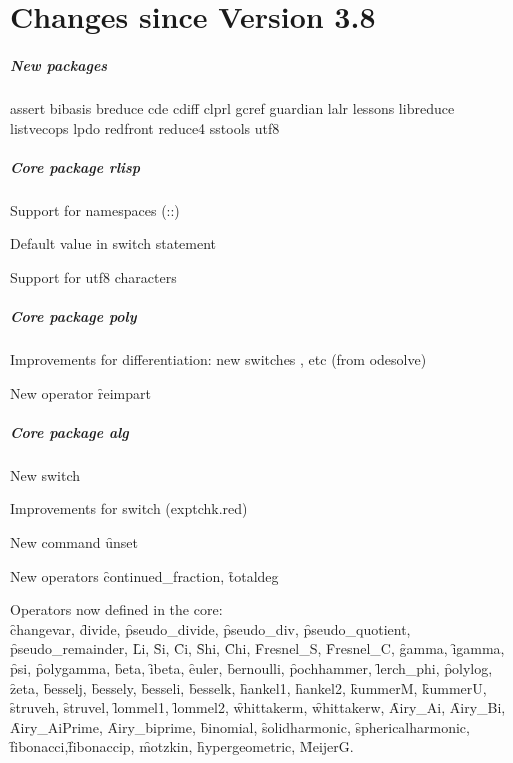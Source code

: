 \chapter{Changes since Version 3.8}

\paragraph*{New packages}

assert
bibasis
breduce
cde
cdiff
clprl
gcref
guardian
lalr
lessons
libreduce
listvecops
lpdo
redfront
reduce4
sstools
utf8

\paragraph*{Core package rlisp}

Support for namespaces (::)

Default value in switch statement

Support for utf8 characters

\paragraph*{Core package poly}

Improvements for differentiation: new switches ,  etc
(from odesolve)

New operator \f{reimpart}

\paragraph*{Core package alg}

New switch 

Improvements for switch  (exptchk.red)

New command \f{unset}

New operators \f{continued\_fraction}, \f{totaldeg}

Operators now defined in the \REDUCE core:\\
\f{changevar},
\f{divide}, \f{pseudo\_divide}, \f{pseudo\_div}, \f{pseudo\_quotient}, \f{pseudo\_remainder},
\f{Li}, \f{Si}, \f{Ci}, \f{Shi}, \f{Chi},
\f{Fresnel\_S}, \f{Fresnel\_C},
\f{gamma}, \f{igamma}, \f{psi}, \f{polygamma}, \f{beta}, \f{ibeta},
\f{euler},
\f{bernoulli}, \f{pochhammer}, \f{lerch\_phi}, \f{polylog}, \f{zeta}, 
\f{besselj},
\f{bessely},
\f{besseli},
\f{besselk},
\f{hankel1},
\f{hankel2},
\f{kummerM},
\f{kummerU},
\f{struveh},
\f{struvel},
\f{lommel1},
\f{lommel2},
\f{whittakerm},
\f{whittakerw},
\f{Airy\_Ai},
\f{Airy\_Bi},
\f{Airy\_AiPrime},
\f{Airy\_biprime},
\f{binomial},
\f{solidharmonic},
\f{sphericalharmonic},
\f{fibonacci},\f{fibonaccip},
\f{motzkin},
\f{hypergeometric}, \f{MeijerG}.

